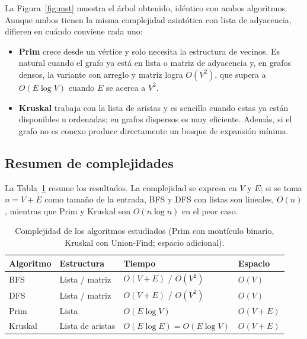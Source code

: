 \documentclass[conference]{IEEEtran}
\begin{document}
La Figura~\ref{fig:mst} muestra el árbol obtenido, idéntico con ambos algoritmos. Aunque ambos tienen la misma complejidad asintótica con lista de adyacencia, difieren en cuándo conviene cada uno:
\begin{itemize}
  \item \textbf{Prim} crece desde un vértice y solo necesita la estructura de vecinos. Es natural cuando el grafo ya está en lista o matriz de adyacencia y, en grafos densos, la variante con arreglo y matriz logra $O(V^2)$, que supera a $O(E\log V)$ cuando $E$ se acerca a $V^2$.
  \item \textbf{Kruskal} trabaja con la lista de aristas y es sencillo cuando estas ya están disponibles u ordenadas; en grafos dispersos es muy eficiente. Además, si el grafo no es conexo produce directamente un bosque de expansión mínima.
\end{itemize}

\subsection{Resumen de complejidades}
La Tabla~\ref{tab:resumen} resume los resultados. La complejidad se expresa en $V$ y $E$; si se toma $n=V+E$ como tamaño de la entrada, BFS y DFS con listas son lineales, $O(n)$, mientras que Prim y Kruskal son $O(n\log n)$ en el peor caso.

\begin{table}[t]
\caption{Complejidad de los algoritmos estudiados (Prim con montículo binario, Kruskal con Union-Find; espacio adicional).}
\label{tab:resumen}
\centering
\footnotesize
\setlength{\tabcolsep}{2pt}
\begin{tabular}{@{}p{1.3cm}p{2.0cm}p{3.3cm}p{1.2cm}@{}}
\toprule
Algoritmo & Estructura & Tiempo & Espacio \\
\midrule
BFS & Lista / matriz & $O(V+E)$ / $O(V^2)$ & $O(V)$ \\
DFS & Lista / matriz & $O(V+E)$ / $O(V^2)$ & $O(V)$ \\
Prim & Lista & $O(E\log V)$ & $O(V+E)$ \\
Kruskal & Lista de aristas & $O(E\log E)=O(E\log V)$ & $O(V+E)$ \\
\bottomrule
\end{tabular}
\end{table}

\end{document}
